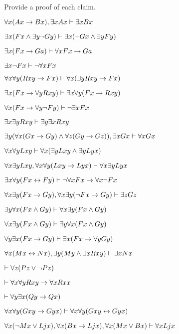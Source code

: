 \problempart
\label{pr.someFOLproofs}
Provide a proof of each claim.
\begin{earg}

\item $\forall x(Ax\rightarrow Bx), \exists x Ax \vdash \exists x Bx$
\item $\exists x(Fx \wedge \exists y\neg Gy) \vdash \exists x(\neg Gx \wedge \exists yFy)$
\item  $\exists x(Fx\rightarrow Ga) \vdash \forall xFx\rightarrow Ga$
\item  $\exists x \neg Fx \vdash \neg \forall xFx$
\item  $\forall x \forall y(Rxy \rightarrow Fx) \vdash \forall x(\exists yRxy \rightarrow Fx)$ 
\item $\exists x(Fx \rightarrow \forall yRxy) \vdash \exists x \forall y(Fx \rightarrow Rxy)$
\item $\forall x(Fx\rightarrow \forall y\neg Fy) \vdash \neg \exists xFx$
\item $\exists x\exists yRxy \vdash \exists y \exists xRxy$
\item  $\exists y(\forall x(Gx\rightarrow Gy)\wedge \forall z(Gy\rightarrow Gz)), \exists xGx \vdash \forall xGx$
\item $\forall x\forall yLxy \vdash \forall x(\exists yLxy \wedge \exists yLyx)$
\item $\forall x\exists yLxy, \forall x \forall y(Lxy \rightarrow Lyx) \vdash \forall x\exists yLyx$
\item $\exists x\forall y (Fx \leftrightarrow Fy) \vdash \neg \forall xFx \rightarrow \forall x\neg Fx$
\item $\forall x \exists y(Fx \rightarrow Gy), \forall x\exists y(\neg Fx \rightarrow Gy) \vdash \exists zGz$
\item $ \exists y\forall x(Fx \wedge Gy) \vdash \forall x \exists y(Fx \wedge Gy)$
\item $\forall x \exists y(Fx \wedge Gy) \vdash \exists y\forall x(Fx \wedge Gy)$
\item $\forall y\exists x(Fx \rightarrow Gy) \vdash \exists x(Fx \rightarrow \forall y Gy)$
\item $\forall x(Mx \leftrightarrow Nx), \exists y(My\wedge\exists x Rxy)\vdash \exists x Nx$
\item $\vdash\forall z (Pz \vee \neg Pz)$
\item $\vdash\forall x \forall yRxy\rightarrow \forall xRxx$
\item $\vdash\forall y \exists x (Qy \rightarrow Qx)$
\item $\forall x \forall y (Gxy \rightarrow Gyx) \vdash \forall x\forall y (Gxy \leftrightarrow Gyx)$
\item $\forall x(\neg Mx \vee Ljx), \forall x(Bx\rightarrow Ljx), \forall x(Mx\vee Bx)\vdash \forall xLjx$
\end{earg}


